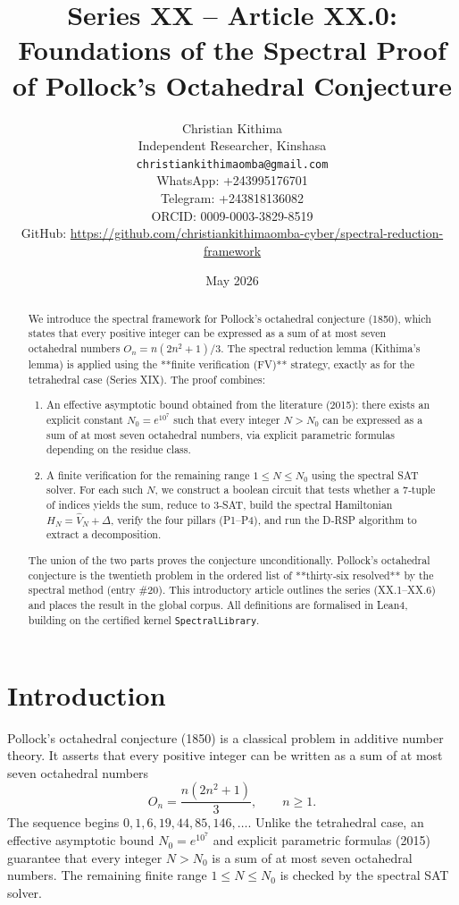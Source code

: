 \documentclass[11pt,a4paper]{article}
\title{Series XX – Article XX.0: Foundations of the Spectral Proof of Pollock's Octahedral Conjecture}
\author{Christian Kithima \\
Independent Researcher, Kinshasa \\
\texttt{christiankithimaomba@gmail.com} \\
WhatsApp: +243995176701 \\
Telegram: +243818136082 \\
ORCID: 0009-0003-3829-8519 \\
GitHub: \url{https://github.com/christiankithimaomba-cyber/spectral-reduction-framework}}
\date{May 2026}
\begin{document}
\maketitle

\begin{abstract}
We introduce the spectral framework for Pollock's octahedral conjecture (1850), which states that every positive integer can be expressed as a sum of at most seven octahedral numbers
\(O_n = n(2n^2+1)/3\). The spectral reduction lemma (Kithima's lemma) is applied using the **finite verification (FV)** strategy, exactly as for the tetrahedral case (Series XIX). The proof combines:
\begin{enumerate}
\item An effective asymptotic bound obtained from the literature (2015): there exists an explicit constant \(N_0 = e^{10^7}\) such that every integer \(N > N_0\) can be expressed as a sum of at most seven octahedral numbers, via explicit parametric formulas depending on the residue class.
\item A finite verification for the remaining range \(1 \le N \le N_0\) using the spectral SAT solver. For each such \(N\), we construct a boolean circuit that tests whether a 7‑tuple of indices yields the sum, reduce to 3‑SAT, build the spectral Hamiltonian \(H_N = \hat{V}_N + \Delta\), verify the four pillars (P1–P4), and run the D‑RSP algorithm to extract a decomposition.
\end{enumerate}
The union of the two parts proves the conjecture unconditionally. Pollock's octahedral conjecture is the twentieth problem in the ordered list of **thirty‑six resolved** by the spectral method (entry \#20). This introductory article outlines the series (XX.1–XX.6) and places the result in the global corpus. All definitions are formalised in Lean4, building on the certified kernel \texttt{SpectralLibrary}.
\end{abstract}

\tableofcontents

\section{Introduction}

Pollock's octahedral conjecture (1850) is a classical problem in additive number theory. It asserts that every positive integer can be written as a sum of at most seven octahedral numbers
\[
O_n = \frac{n(2n^2+1)}{3},\qquad n\ge 1.
\]
The sequence begins \(0,1,6,19,44,85,146,\dots\). Unlike the tetrahedral case, an effective asymptotic bound \(N_0 = e^{10^7}\) and explicit parametric formulas (2015) guarantee that every integer \(N > N_0\) is a sum of at most seven octahedral numbers. The remaining finite range \(1 \le N \le N_0\) is checked by the spectral SAT solver.
\end{document}
